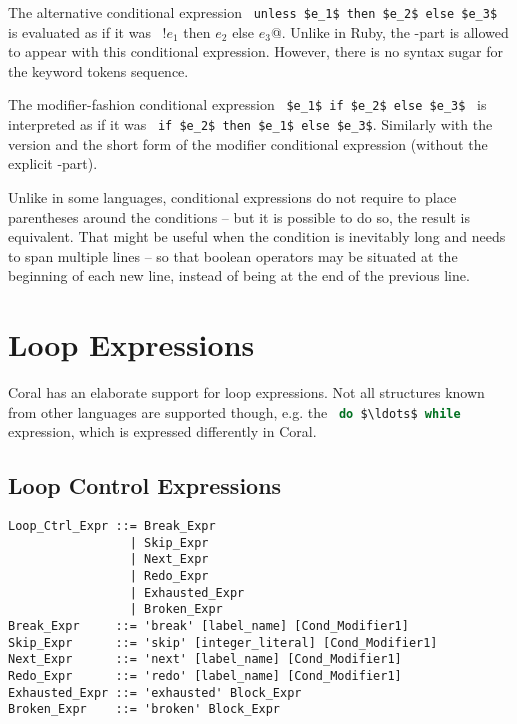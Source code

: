 The alternative conditional expression ~\lstinline!unless $e_1$ then $e_2$ else $e_3$!~ is evaluated as if it was ~\lstinline@if !$e_1$ then $e_2$ else $e_3$@. Unlike in Ruby, the -part is allowed to appear with this conditional expression. However, there is no syntax sugar for the  keyword tokens sequence. 

The modifier-fashion conditional expression ~\lstinline!$e_1$ if $e_2$ else $e_3$!~ is interpreted as if it was ~\lstinline!if $e_2$ then $e_1$ else $e_3$!. Similarly with the  version and the short form of the modifier conditional expression (without the explicit -part). 

Unlike in some languages, conditional expressions do not require to place parentheses around the conditions -- but it is possible to do so, the result is equivalent. That might be useful when the condition is inevitably long and needs to span multiple lines -- so that boolean operators may be situated at the beginning of each new line, instead of being at the end of the previous line. 






\section{Loop Expressions}

Coral has an elaborate support for loop expressions. Not all structures known from other languages are supported though, e.g. the ~\lstinline[language=Java]!do $\ldots$ while!~ expression, which is expressed differently in Coral. 






\subsection{Loop Control Expressions}
\label{sec:loop-control-expressions}

\syntax\begin{lstlisting}
Loop_Ctrl_Expr ::= Break_Expr
                 | Skip_Expr
                 | Next_Expr
                 | Redo_Expr
                 | Exhausted_Expr
                 | Broken_Expr
Break_Expr     ::= 'break' [label_name] [Cond_Modifier1]
Skip_Expr      ::= 'skip' [integer_literal] [Cond_Modifier1]
Next_Expr      ::= 'next' [label_name] [Cond_Modifier1]
Redo_Expr      ::= 'redo' [label_name] [Cond_Modifier1]
Exhausted_Expr ::= 'exhausted' Block_Expr
Broken_Expr    ::= 'broken' Block_Expr
\end{lstlisting}

